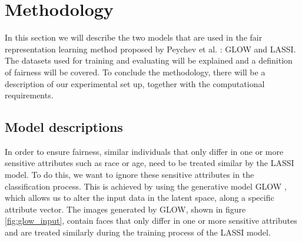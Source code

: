 

\section{Methodology}\label{sec:methodology}

In this section we will describe the two models that are used in the fair representation learning method proposed by Peychev et al. \cite{peychev2022latent}: GLOW and LASSI. The datasets used for training and evaluating will be explained and a definition of fairness will be covered. To conclude the methodology, there will be a description of our experimental set up, together with the computational requirements. 




\subsection{Model descriptions}\label{subsec: model_description}

In order to ensure fairness, similar individuals that only differ in one or more sensitive attributes such as race or age, need to be treated similar by the LASSI model. To do this, we want to ignore these sensitive attributes in the classification process. This is achieved by using the generative model GLOW \cite{kingmaglow}, which allows us to alter the input data in the latent space, along a specific attribute vector. The images generated by GLOW, shown in figure \ref{fig:glow_input}, contain faces that only differ in one or more sensitive attributes and are treated similarly during the training process of the LASSI model.

